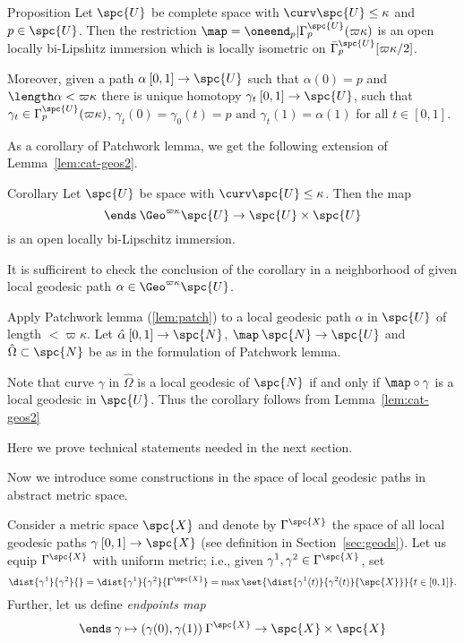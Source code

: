 \begin{thm}{Proposition}\label{lem:cat-geos3-cba}
Let $\spc{U}$ be complete space with $\curv\spc{U}\le\kappa$ and $p\in\spc{U}$.
Then the restriction
$\map=\oneend_p|\Gamma^\spc{U}_p(\varpi\kappa)$
is an open locally bi-Lipshitz immersion 
which is locally isometric on $\bar\Gamma^\spc{U}_p[\varpi\kappa/2]$.

Moreover, given a path $\alpha\:[0,1]\to\spc{U}$ such that
$\alpha(0)=p$ and $\length\alpha<\varpi\kappa$ there is unique homotopy $\gamma_t\:[0,1]\to\spc{U}$, such that $\gamma_t\in\Gamma^\spc{U}_p(\varpi\kappa)$,
$\gamma_t(0)=\gamma_0(t)=p$ and $\gamma_t(1)=\alpha(1)$ for all $t\in[0,1]$.
\end{thm}

As a corollary of Patchwork lemma, we get the following extension of Lemma~\ref{lem:cat-geos2}.

\begin{thm}{Corollary}\label{cor:homotopy0}
Let $\spc{U}$ be space with $\curv\spc{U}\le\kappa$.
Then the map 
$$\ends\:\Geo^{\varpi\kappa}\spc{U}\to \spc{U}\times\spc{U}$$ 
is an open locally bi-Lipschitz immersion.
\end{thm}

 It is sufficirent to check the conclusion of the corollary in a neighborhood of given local geodesic path $\alpha\in\Geo^{\varpi\kappa}\spc{U}$.

Apply Patchwork lemma (\ref{lem:patch}) to a local geodesic path $\alpha$ in $\spc{U}$ of length $<\varpi\kappa$.
Let  
$\hat\alpha\:[0,1]\to\spc{N}$, 
$\map\:\spc{N}\to\spc{U}$
and $\hat\Omega\subset\spc{N}$
be as in the formulation of Patchwork lemma.

Note that curve $\gamma$ in $\hat\Omega$ is a local geodesic of $\spc{N}$ if and only if $\map\circ\gamma$ is a local geodesic in $\spc{U}$.
Thus the corollary follows from Lemma~\ref{lem:cat-geos2}
\qeds


















Here we prove technical statements needed in the next section. 

Now we introduce some constructions in the space of local geodesic paths in abstract metric space.

Consider a metric space $\spc{X}$ 
and denote by $\Gamma^\spc{X}$ 
the space of all local geodesic  paths $\gamma\:[0,1]\to\spc{X}$ 
(see definition in Section~\ref{sec:geods}).
Let us equip $\Gamma^\spc{X}$ with uniform metric;
i.e., given $\gamma^1,\gamma^2\in \Gamma^\spc{X}$,
set 
$$\dist{\gamma^1}{\gamma^2}{}
=
\dist{\gamma^1}{\gamma^2}{\Gamma^\spc{X}}
=
\max\set{\dist{\gamma^1(t)}{\gamma^2(t)}{\spc{X}}}{t\in [0,1]}.$$
Further, let us define 
\emph{endpoints map}%
$$
\ends\:\gamma\mapsto (\gamma(0),\gamma(1))\:\Gamma^\spc{X}\to\spc{X}\times\spc{X}
$$

